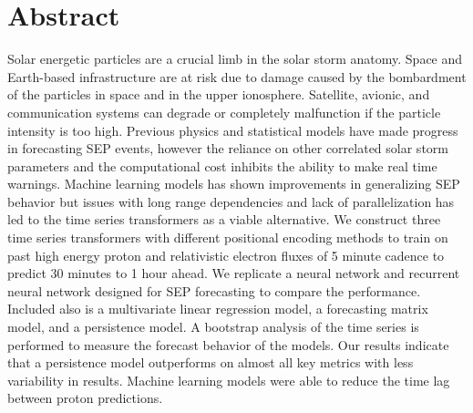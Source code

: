 \section{Abstract}
\label{sec:abstract}
Solar energetic particles are a crucial limb in the solar storm anatomy.  Space and Earth-based infrastructure are at risk 
due to damage caused by the bombardment of the particles in space and in the upper ionosphere. Satellite, avionic, and communication systems can degrade or completely malfunction  if the particle intensity is too high.
Previous physics and statistical models have made progress in forecasting SEP events, however the reliance on other correlated solar storm parameters and the computational cost
inhibits the ability to make real time warnings. Machine learning models has shown improvements in generalizing SEP behavior but issues with long range dependencies
and lack of parallelization has led to the time series transformers as a viable alternative. We construct three time series transformers with different positional encoding methods to 
train on past high energy proton and relativistic electron fluxes  of 5 minute cadence to predict 30 minutes to 1 hour ahead. We replicate a neural network and recurrent neural network designed for SEP 
forecasting to compare the performance. Included also is a multivariate linear regression model, a forecasting matrix model, and a persistence model. A bootstrap analysis of the time series is performed to measure the forecast behavior of the models. Our results indicate that
a persistence model outperforms on almost all key metrics with less variability in results. Machine learning models were able to reduce the time lag between proton predictions. 


